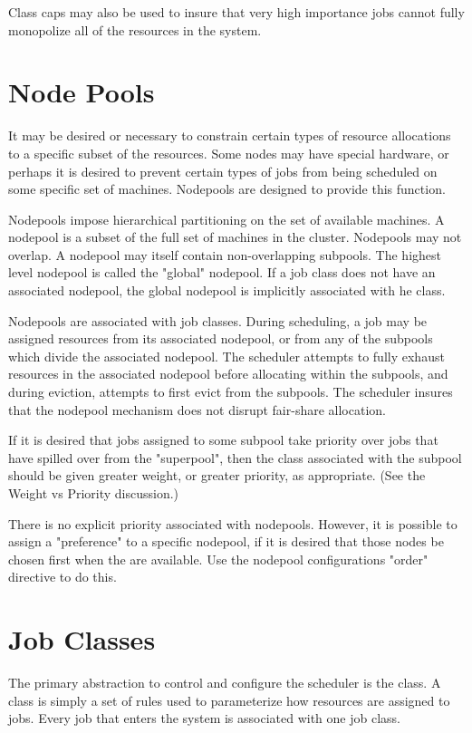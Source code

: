     Class caps may also be used to insure that very high importance jobs cannot fully monopolize all of 
    the resources in the system. 

    \section{Node Pools}
    It may be desired or necessary to constrain certain types of resource allocations to a specific
    subset of the resources. Some nodes may have special hardware, or perhaps it is desired to
    prevent certain types of jobs from being scheduled on some specific set of machines. Nodepools
    are designed to provide this function.

    Nodepools impose hierarchical partitioning on the set of available machines. A nodepool is a
    subset of the full set of machines in the cluster. Nodepools may not overlap. A nodepool may
    itself contain non-overlapping subpools. The highest level nodepool is called the "global"
    nodepool. If a job class does not have an associated nodepool, the global nodepool is implicitly
    associated with he class.

    Nodepools are associated with job classes. During scheduling, a job may be assigned resources
    from its associated nodepool, or from any of the subpools which divide the associated nodepool.
    The scheduler attempts to fully exhaust resources in the associated nodepool before allocating
    within the subpools, and during eviction, attempts to first evict from the subpools. The
    scheduler insures that the nodepool mechanism does not disrupt fair-share allocation.

    If it is desired that jobs assigned to some subpool take priority over jobs that have spilled
    over from the "superpool", then the class associated with the subpool should be given greater
    weight, or greater priority, as appropriate. (See the Weight vs Priority discussion.)

    There is no explicit priority associated with nodepools. However, it is possible to assign a
    "preference" to a specific nodepool, if it is desired that those nodes be chosen first when the
    are available. Use the nodepool configurations "order" directive to do this.

    \section{Job Classes}
    \label{sec:rm.job-classes}
    The primary abstraction to control and configure the scheduler is the class. A class is simply a set 
    of rules used to parameterize how resources are assigned to jobs. Every job that enters the system is 
    associated with one job class. 
    
